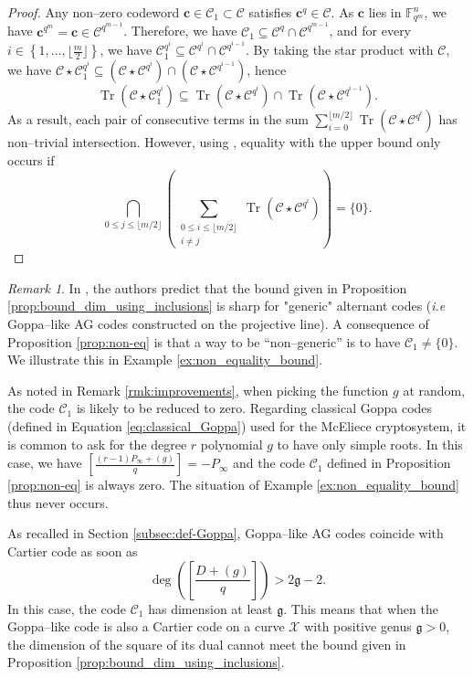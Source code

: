 \documentclass[a4paper]{amsart}
\theoremstyle{definition}
\theoremstyle{remark}
\newtheorem{remark}[thm]{Remark}
\DeclareMathOperator{\trace}{Tr}
\newcommand{\calC}{\mathcal{C}}
\newcommand{\calX}{\mathcal{X}}
\newcommand{\fqm}{\mathbb{F}_{q^m}}
\newcommand{\Tr}[1]{\trace\!\left(#1\right)}
\newcommand{\set}[1]{\left\{#1\right\}}
\begin{document}
\begin{proof}
Any non--zero codeword $\mathbf{c} \in  \calC_1 \subset \calC$ satisfies $\mathbf{c}^q \in \calC$. As $\mathbf{c}$ lies in $\fqm^n$, we have $\mathbf{c}^{q^m}=\mathbf{c} \in \calC^{q^{m-1}}$. Therefore,  we have $\calC_1 \subseteq \calC^{q} \cap \calC^{q^{m-1}}$, and for every $i \in \set{1,\dots,\lfloor \frac{m}{2}\rfloor}$, we have $\calC_1^{q^i} \subseteq \calC^{q^i} \cap \calC^{q^{i-1}}$. By taking the star product with $\calC$, we have $\calC \star \calC_1^{q^i} \subseteq \left(\calC \star  \calC^{q^i}\right) \cap \left(\calC \star  \calC^{q^{i-1}}\right)$, hence
\[\Tr{\calC\star\calC_1^{q^i}} \subseteq \Tr{\calC\star\calC^{q^i}} \cap \Tr{\calC\star\calC^{q^{i-1}}}.\]
As a result, each pair of consecutive terms in the sum $\sum\limits_{i=0}^{\lfloor m/2 \rfloor} \Tr{\calC \star \calC^{q^i}}$ has non--trivial intersection. However, using \cite[Theorem~2]{T19}, equality with the upper bound only occurs if
\[\bigcap_{0\leq j \leq \lfloor m/2\rfloor} \left( \sum_{\substack{0\leq i \leq \lfloor m/2 \rfloor\\ i\neq j}} \Tr{\calC \star \calC^{q^i}} \right)= \{0\}.\]
\end{proof}

\begin{remark}\label{rk:discuss_bound}
In \cite{FGO+13}, the authors predict that the bound given in Proposition \ref{prop:bound_dim_using_inclusions} is sharp for "generic" alternant codes (\emph{i.e} Goppa--like AG codes constructed on the projective line). A consequence of Proposition \ref{prop:non-eq} is that a way to be ``non--generic'' is to have $\calC_1 \neq \{0\}$. We illustrate this in Example \ref{ex:non_equality_bound}. 	

As noted in Remark \ref{rmk:improvements}, when picking the function $g$ at random, the code $\calC_1$ is likely to be reduced to zero. Regarding classical Goppa codes (defined in Equation \eqref{eq:classical_Goppa}) used for the McEliece cryptosystem, it is common to ask for the degree $r$ polynomial $g$ to have only simple roots. In this case, we have $ \left[ \frac{(r-1)P_\infty+(g)}{q} \right] = -P_\infty$ and the code $\calC_1$ defined in Proposition \ref{prop:non-eq} is always zero. The situation of Example \ref{ex:non_equality_bound} thus never occurs.

As recalled in Section \ref{subsec:def-Goppa}, Goppa--like AG codes coincide with Cartier code as soon as $$\deg\left(\left[ \frac{D+(g)}{q} \right] \right)> 2 \mathfrak{g}-2.$$ In this case, the code $\calC_1$ has dimension at least $\mathfrak{g}$. This means that when the Goppa--like code is also a Cartier code on a curve $\calX$ with positive genus $\mathfrak{g} >0$, the dimension of the square of its dual cannot meet the bound given in Proposition \ref{prop:bound_dim_using_inclusions}.
\end{remark}
\end{document}
